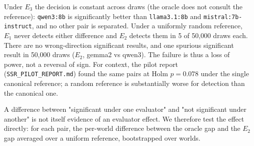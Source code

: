 \documentclass[11pt]{article}
\begin{document}
\begin{table}[htbp]
\centering
\footnotesize
\setlength{\tabcolsep}{3pt}
\caption{World-Level Significance Under Each Evaluator (All 50,000 Draws)}
\end{table}
Under $E_3$ the decision is constant across draws (the oracle does not consult the reference): \texttt{qwen3:8b} is significantly better than \texttt{llama3.1:8b} and \texttt{mistral:7b-instruct}, and no other pair is separated. Under a uniformly random reference, $E_1$ never detects either difference and $E_2$ detects them in 5 of 50,000 draws each. There are no wrong-direction significant results, and one spurious significant result in 50,000 draws ($E_2$, gemma2 vs qwen3). The failure is thus a loss of power, not a reversal of sign. For context, the pilot report (\texttt{SSR\_PILOT\_REPORT.md}) found the same pairs at Holm $p = 0.078$ under the single canonical reference; a random reference is substantially worse for detection than the canonical one.

A difference between "significant under one evaluator" and "not significant under another" is not itself evidence of an evaluator effect. We therefore test the effect directly: for each pair, the per-world difference between the oracle gap and the $E_2$ gap averaged over a uniform reference, bootstrapped over worlds.
\end{document}

